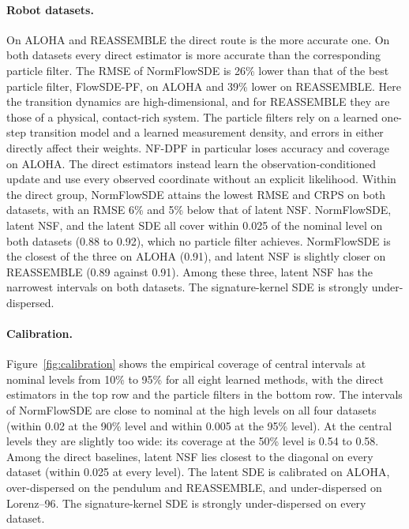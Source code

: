 \paragraph{Robot datasets.}
On ALOHA and REASSEMBLE the direct route is the more accurate one. On both datasets every direct estimator is more accurate than the corresponding particle filter. The RMSE of NormFlowSDE is 26\% lower than that of the best particle filter, FlowSDE-PF, on ALOHA and 39\% lower on REASSEMBLE. Here the transition dynamics are high-dimensional, and for REASSEMBLE they are those of a physical, contact-rich system. The particle filters rely on a learned one-step transition model and a learned measurement density, and errors in either directly affect their weights. NF-DPF in particular loses accuracy and coverage on ALOHA. The direct estimators instead learn the observation-conditioned update and use every observed coordinate without an explicit likelihood. Within the direct group, NormFlowSDE attains the lowest RMSE and CRPS on both datasets, with an RMSE 6\% and 5\% below that of latent NSF. NormFlowSDE, latent NSF, and the latent SDE all cover within 0.025 of the nominal level on both datasets (0.88 to 0.92), which no particle filter achieves. NormFlowSDE is the closest of the three on ALOHA (0.91), and latent NSF is slightly closer on REASSEMBLE (0.89 against 0.91). Among these three, latent NSF has the narrowest intervals on both datasets. The signature-kernel SDE is strongly under-dispersed.

\paragraph{Calibration.}
Figure~\ref{fig:calibration} shows the empirical coverage of central intervals at nominal levels from 10\% to 95\% for all eight learned methods, with the direct estimators in the top row and the particle filters in the bottom row. The intervals of NormFlowSDE are close to nominal at the high levels on all four datasets (within 0.02 at the 90\% level and within 0.005 at the 95\% level). At the central levels they are slightly too wide: its coverage at the 50\% level is 0.54 to 0.58. Among the direct baselines, latent NSF lies closest to the diagonal on every dataset (within 0.025 at every level). The latent SDE is calibrated on ALOHA, over-dispersed on the pendulum and REASSEMBLE, and under-dispersed on Lorenz--96. The signature-kernel SDE is strongly under-dispersed on every dataset. 

